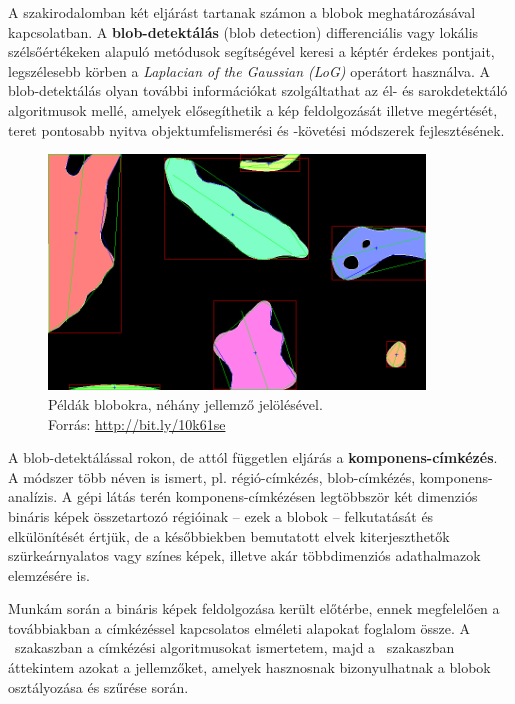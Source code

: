 A szakirodalomban két eljárást tartanak számon a blobok meghatározásával kapcsolatban. A \textbf{blob-detektálás} (blob detection) differenciális vagy lokális szélsőértékeken alapuló metódusok segítségével keresi a képtér érdekes pontjait, legszélesebb körben a \emph{Laplacian of the Gaussian (LoG)} operátort használva. A blob-detektálás olyan további információkat szolgáltathat az él- és sarokdetektáló algoritmusok mellé, amelyek elősegíthetik a kép feldolgozását illetve megértését, teret pontosabb nyitva objektumfelismerési és -követési módszerek fejlesztésének.

\begin{figure}[!ht]
\centering
\includegraphics[width=100mm, keepaspectratio]{figures/blob_sshot.png}
\caption{Példák blobokra, néhány jellemző jelölésével.\\Forrás: \url{http://bit.ly/10k61se}}
\label{fig:blob_sshot}
\end{figure}

A blob-detektálással rokon, de attól független eljárás a \textbf{komponens-címkézés}. A módszer több néven is ismert, pl. régió-címkézés, blob-címkézés, komponens-analízis. A gépi látás terén komponens-címkézésen legtöbbször két dimenziós bináris képek összetartozó régióinak -- ezek a blobok -- felkutatását és elkülönítését értjük, de a későbbiekben bemutatott elvek kiterjeszthetők szürkeárnyalatos vagy színes képek, illetve akár többdimenziós adathalmazok elemzésére is.

\bigskip

Munkám során a bináris képek feldolgozása került előtérbe, ennek megfelelően a továbbiakban a címkézéssel kapcsolatos elméleti alapokat foglalom össze. A ~szakaszban a címkézési algoritmusokat ismertetem, majd a ~szakaszban áttekintem azokat a jellemzőket, amelyek hasznosnak bizonyulhatnak a blobok osztályozása és szűrése során.

